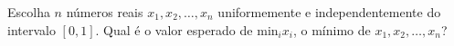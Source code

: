 Escolha $n$ números reais $x_1, x_2, \dots, x_n$ uniformemente e independentemente do intervalo $[0,1]$. Qual é o valor esperado de $\mathrm{min}_i x_i$, o mínimo de $x_1, x_2, \dots, x_n$?
